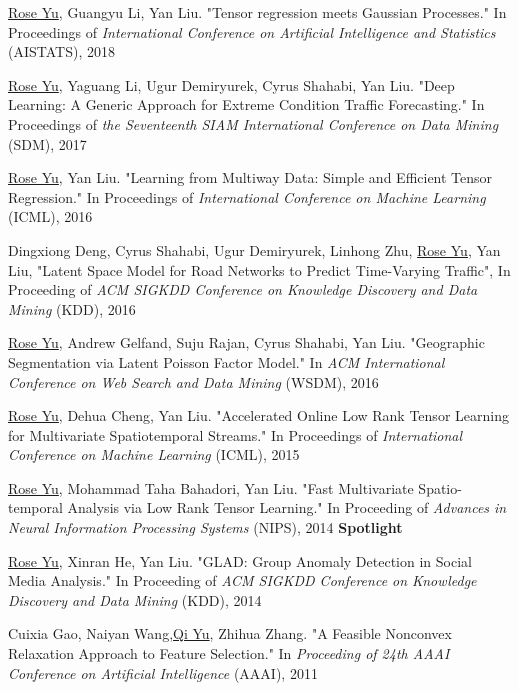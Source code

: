 \documentclass[margin,line]{res}
\begin{document}
\begin{resume}
\begin{enumerate}[label={[C\arabic*]}]
\item  \underline{Rose Yu}, Guangyu Li, Yan Liu. "Tensor regression meets Gaussian Processes." In Proceedings  of   \textit{International Conference on Artificial Intelligence and Statistics} (AISTATS), 2018 

\item \underline{Rose Yu}, Yaguang Li, Ugur Demiryurek, Cyrus Shahabi, Yan Liu. "Deep Learning: A Generic Approach for Extreme Condition Traffic Forecasting." In   Proceedings  of  \textit{the Seventeenth SIAM International Conference on Data Mining }(SDM), 2017

\item \underline{Rose Yu}, Yan Liu. "Learning from Multiway Data: Simple and Efficient Tensor Regression." In Proceedings  of  \textit{International Conference on Machine Learning }(ICML),   2016

\item Dingxiong Deng, Cyrus Shahabi, Ugur Demiryurek, Linhong Zhu,  \underline{Rose Yu}, Yan Liu, 
"Latent Space Model for Road Networks to Predict Time-Varying Traffic", In Proceeding of  \textit{ACM SIGKDD Conference on Knowledge Discovery and Data Mining } (KDD), 2016


\item \underline{Rose Yu}, Andrew Gelfand, Suju Rajan, Cyrus Shahabi, Yan Liu. "Geographic Segmentation via Latent Poisson Factor Model." In \textit{ACM International Conference on Web Search and Data Mining} (WSDM), 2016 

\item \underline{Rose Yu}, Dehua Cheng, Yan Liu. "Accelerated Online Low Rank Tensor Learning for Multivariate Spatiotemporal Streams." In Proceedings  of  \textit{International Conference on Machine Learning} (ICML), 2015

\item \underline{Rose Yu}, Mohammad Taha Bahadori, Yan Liu. "Fast Multivariate Spatio-temporal Analysis via Low Rank Tensor Learning." In Proceeding of  \textit{Advances in Neural Information Processing Systems} (NIPS), 2014 \textbf{Spotlight}

\item \underline{Rose Yu}, Xinran He, Yan Liu. "GLAD: Group Anomaly Detection in Social Media Analysis." In Proceeding of  \textit{ACM SIGKDD Conference on Knowledge Discovery and Data Mining} (KDD), 2014

\item Cuixia Gao, Naiyan Wang,\underline{Qi Yu}, Zhihua Zhang. "A Feasible Nonconvex Relaxation Approach to Feature Selection." In \textit{Proceeding of 24th AAAI Conference on Artificial Intelligence} (AAAI), 2011 


\end{enumerate}
\end{resume}
\end{document}
